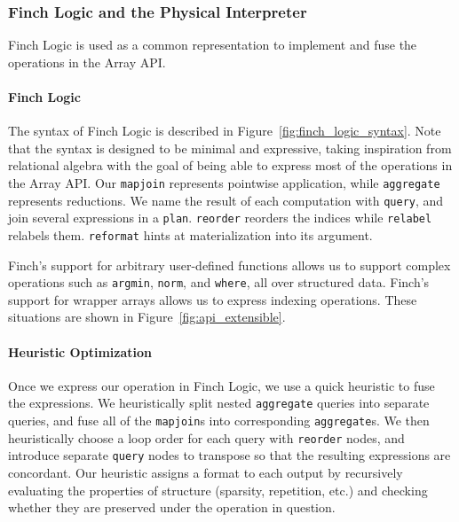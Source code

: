 \subsubsection{Finch Logic and the Physical Interpreter}
Finch Logic is used as a common representation to implement and fuse the operations in the Array API.

\paragraph{Finch Logic}
The syntax of Finch Logic is described in Figure~\ref{fig:finch_logic_syntax}.
%
Note that the syntax is designed to be minimal and expressive, taking inspiration from relational algebra with the goal of being able to express most of the operations in the Array API.
%
Our \texttt{mapjoin} represents pointwise application, while \texttt{aggregate} represents reductions.
%
We name the result of each computation with \texttt{query}, and join several expressions in a \texttt{plan}.
%
\texttt{reorder} reorders the indices while \texttt{relabel} relabels them.
%
\texttt{reformat} hints at materialization into its argument.

Finch's support for arbitrary user-defined functions allows us to support complex operations such as \texttt{argmin}, \texttt{norm}, and \texttt{where}, all over structured data. Finch's support for wrapper arrays allows us to express indexing operations. These situations are shown in Figure~\ref{fig:api_extensible}.
\begin{figure}

\end{figure}

\paragraph{Heuristic Optimization}
Once we express our operation in Finch Logic, we use a quick heuristic to fuse the expressions. 
%
We heuristically split nested \texttt{aggregate} queries into separate queries, and fuse all of the \texttt{mapjoin}s into corresponding \texttt{aggregate}s.
%
We then heuristically choose a loop order for each query with \texttt{reorder} nodes, and introduce separate \texttt{query} nodes to transpose so that the resulting expressions are concordant.
%
Our heuristic assigns a format to each output by recursively evaluating the properties of structure (sparsity, repetition, etc.) and checking whether they are preserved under the operation in question.

